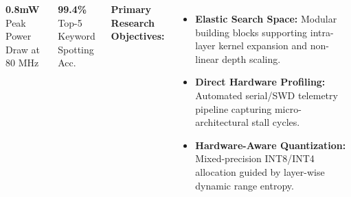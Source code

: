 \documentclass[25pt, a0paper, portrait]{tikzposter}
\begin{document}
\begin{columns}
{    \par \vspace{0.6em}

    \begin{minipage}[t]{0.48\linewidth}
      \begin{tcolorbox}[statbox]
        {\Huge \textbf{\textcolor{AmberAccent}{0.8mW}}} \\
        \vspace{0.2em}
        {\small Peak Power Draw at 80 MHz}
      \end{tcolorbox}
    \end{minipage}
    \hfill
    \begin{minipage}[t]{0.48\linewidth}
      \begin{tcolorbox}[statbox]
        {\Huge \textbf{\textcolor{IndigoBlue}{99.4\%}}} \\
        \vspace{0.2em}
        {\small Top-5 Keyword Spotting Acc.}
      \end{tcolorbox}
    \end{minipage}

    \vspace{1em}
    \textbf{Primary Research Objectives:}
    \begin{itemize}
      \item \textbf{Elastic Search Space:} Modular building blocks supporting intra-layer kernel expansion and non-linear depth scaling.
      \item \textbf{Direct Hardware Profiling:} Automated serial/SWD telemetry pipeline capturing micro-architectural stall cycles.
      \item \textbf{Hardware-Aware Quantization:} Mixed-precision INT8/INT4 allocation guided by layer-wise dynamic range entropy.
    \end{itemize}
  }

\end{columns}
\end{document}
